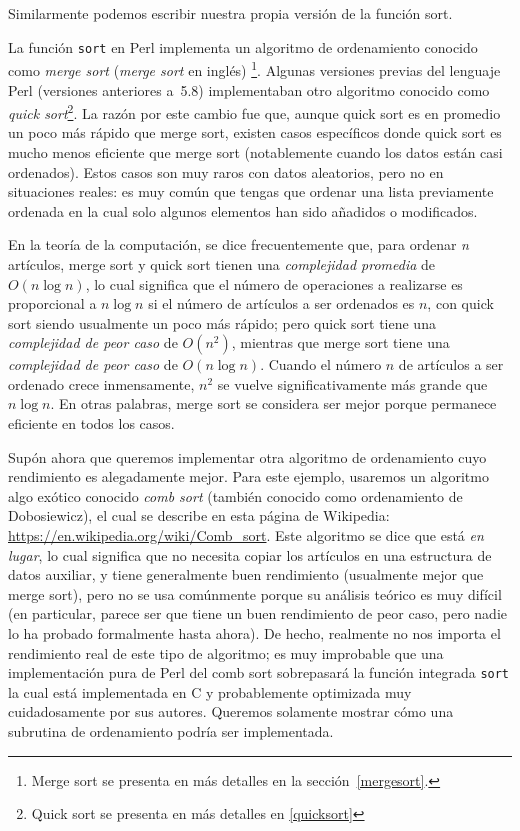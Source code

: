 Similarmente podemos escribir nuestra propia versión 
de la función sort.


La función {\tt sort} en Perl implementa un algoritmo de 
ordenamiento conocido como \emph{merge sort}
(\emph{merge sort} en inglés)
\footnote{Merge sort se presenta en más 
detalles en la sección~\ref{mergesort}.}. Algunas versiones 
previas del lenguaje Perl (versiones anteriores a~5.8) implementaban
otro algoritmo conocido como \emph{quick sort}\footnote{Quick sort 
se presenta en más detalles en \ref{quicksort}}. La razón
por este cambio fue que, aunque quick sort es en promedio un poco
más rápido que merge sort, existen casos específicos donde 
quick sort es mucho menos eficiente que merge sort (notablemente
cuando los datos están casi ordenados). Estos casos son muy raros
con datos aleatorios, pero no en situaciones reales: es muy común
que tengas que ordenar una lista previamente ordenada en la cual
solo algunos elementos han sido añadidos o modificados.

En la teoría de la computación, se dice frecuentemente que, para
ordenar \emph{n} artículos, merge sort y quick sort tienen una \emph{complejidad
promedia} de $O(n \log n)$, lo cual significa que el número de 
operaciones a realizarse es proporcional a $n \log n$ si el número
de artículos a ser ordenados es $n$, con quick sort siendo usualmente
un poco más rápido; pero quick sort tiene una \emph{complejidad de 
peor caso} de $O(n^{2})$, mientras que merge sort tiene una \emph{complejidad de 
peor caso} de $O(n \log n)$. Cuando el número $n$ de artículos a ser ordenado
crece inmensamente, $n^{2}$ se vuelve significativamente más grande que 
$n \log n$. En otras palabras, merge sort se considera ser mejor porque
permanece eficiente en todos los casos.

Supón ahora que queremos implementar otra algoritmo de ordenamiento
cuyo rendimiento es alegadamente mejor. Para este ejemplo, usaremos
un algoritmo algo exótico conocido  \emph{comb sort} (también conocido
como ordenamiento de Dobosiewicz), el cual se describe en esta página
de Wikipedia: \url{https://en.wikipedia.org/wiki/Comb_sort}. Este algoritmo 
se dice que está \emph{en lugar}, lo cual significa que no necesita copiar los 
artículos en una estructura de datos auxiliar, y tiene generalmente 
buen rendimiento (usualmente mejor que merge sort), pero no se
usa comúnmente porque su análisis teórico es muy difícil
(en particular, parece ser que tiene un buen rendimiento de
peor caso, pero nadie lo ha probado formalmente hasta ahora).
De hecho, realmente no nos importa el rendimiento real de este 
tipo de algoritmo; es muy improbable que una implementación 
pura de Perl del comb sort sobrepasará la función integrada
{\tt sort} la cual está implementada en C y probablemente
optimizada muy cuidadosamente por sus autores. Queremos
solamente mostrar cómo una subrutina de ordenamiento podría
ser implementada.

